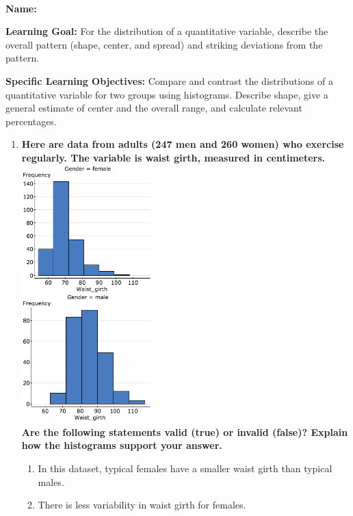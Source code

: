 \ \\
\textbf{Name:\hrulefill{}\hspace{0.4\columnwidth}}

\textbf{Learning Goal:} For the distribution of a quantitative variable,
describe the overall pattern (shape, center, and spread) and striking
deviations from the pattern.

\textbf{Specific Learning Objectives:} Compare and contrast the distributions
of a quantitative variable for two groups using histograms. Describe
shape, give a general estimate of center and the overall range, and
calculate relevant percentages.
\begin{enumerate}
\item \textbf{Here are data from adults (247 men and 260 women) who exercise
regularly. The variable is waist girth, measured in centimeters.}\\
\includegraphics[width=2in]{./img/WaistGirthMF}\\
\textbf{Are the following statements valid (true) or invalid (false)?
Explain how the histograms support your answer.}

\begin{enumerate}
\item In this dataset, typical females have a smaller waist girth than typical
males.\vspace{0.5in}

\item There is less variability in waist girth for females.\vspace{0.5in}


\end{enumerate}
\end{enumerate}
